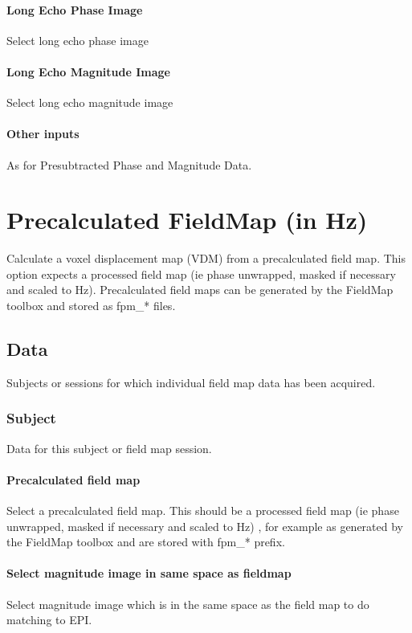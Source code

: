 \paragraph{Long Echo Phase Image}
Select long echo phase image


\paragraph{Long Echo Magnitude Image}
Select long echo magnitude image

\paragraph{Other inputs}
As for Presubtracted Phase and Magnitude Data.

\section{Precalculated FieldMap (in Hz)}
Calculate a voxel displacement map (VDM) from a precalculated field map. This option expects a processed field map (ie phase unwrapped, masked if necessary and scaled to Hz). Precalculated field maps can be generated by the FieldMap toolbox and stored as fpm\_* files.


\subsection{Data}
Subjects or sessions for which individual field map data has been acquired.


\subsubsection{Subject}
Data for this subject or field map session.


\paragraph{Precalculated field map}
Select a precalculated field map. This should be a processed field map (ie phase unwrapped, masked if necessary and scaled to Hz) , for example as generated by the FieldMap toolbox and are stored with fpm\_* prefix.


\paragraph{Select magnitude image in same space as fieldmap}
Select magnitude image which is in the same space as the field map to do matching to EPI.

